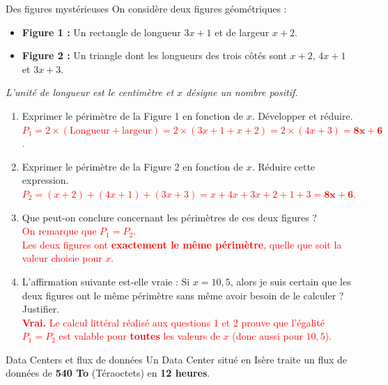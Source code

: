 \documentclass[a4paper]{book}
\begin{document}
{    \begin{exerciceTitre}{Des figures mystérieuses}
        On considère deux figures géométriques :
        \begin{itemize}
            \item \textbf{Figure 1 :} Un rectangle de longueur $3x + 1$ et de largeur $x + 2$.
            \item \textbf{Figure 2 :} Un triangle dont les longueurs des trois côtés sont $x + 2$, $4x + 1$ et $3x + 3$.
        \end{itemize}
        \textit{L'unité de longueur est le centimètre et $x$ désigne un nombre positif.}
        
        \begin{enumerate}
            \item Exprimer le périmètre de la Figure 1 en fonction de $x$. Développer et réduire. \\
            \textcolor{red}{$P_1 = 2 \times (\text{Longueur} + \text{largeur}) = 2 \times (3x + 1 + x + 2) = 2 \times (4x + 3) \mathbf{= 8x + 6}$.}
            
            \item Exprimer le périmètre de la Figure 2 en fonction de $x$. Réduire cette expression. \\
            \textcolor{red}{$P_2 = (x + 2) + (4x + 1) + (3x + 3) = x + 4x + 3x + 2 + 1 + 3 \mathbf{= 8x + 6}$.}
            
            \item Que peut-on conclure concernant les périmètres de ces deux figures ? \\
            \textcolor{red}{On remarque que $P_1 = P_2$. \\
            Les deux figures ont \textbf{exactement le même périmètre}, quelle que soit la valeur choisie pour $x$.}
            
            \item L'affirmation suivante est-elle vraie : \og Si $x = 10,5$, alors je suis certain que les deux figures ont le même périmètre sans même avoir besoin de le calculer \fg{} ? Justifier. \\
            \textcolor{red}{\textbf{Vrai.} Le calcul littéral réalisé aux questions 1 et 2 prouve que l'égalité $P_1 = P_2$ est valable pour \textbf{toutes} les valeurs de $x$ (donc aussi pour $10,5$).}
        \end{enumerate}
    \end{exerciceTitre}
    
    
    \begin{exerciceTitre}{Data Centers et flux de données} 
        Un Data Center situé en Isère traite un flux de données de \textbf{540 To} (Téraoctets) en \textbf{12 heures}.
        

\end{exerciceTitre}}
\end{document}

